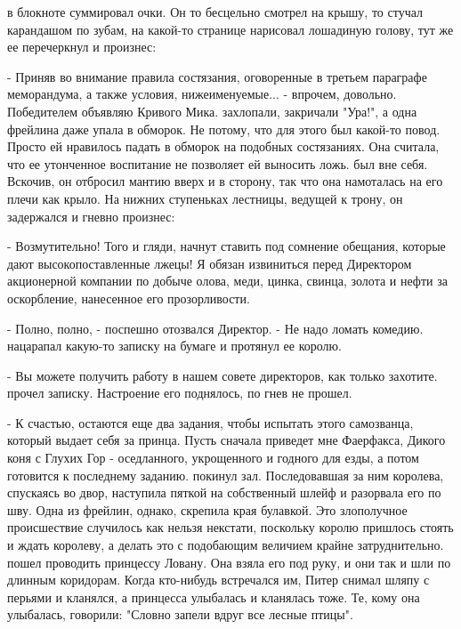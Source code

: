  в блокноте суммировал очки. Он то бесцельно смотрел на 
крышу, то стучал карандашом по зубам, на какой-то странице нарисовал 
лошадиную голову, тут же ее перечеркнул и произнес:
\par- Приняв во внимание правила состязания, оговоренные в третьем 
параграфе меморандума, а также условия, нижеименуемые... - впрочем, 
довольно. Победителем объявляю Кривого Мика.
 захлопали, закричали "Ура!", а одна фрейлина даже упала в 
обморок. Не потому, что для этого был какой-то повод. Просто ей 
нравилось падать в обморок на подобных состязаниях. Она считала, что 
ее утонченное воспитание не позволяет ей выносить ложь.
 был вне себя. Вскочив, он отбросил мантию вверх и в 
сторону, так что она намоталась на его плечи как крыло. На нижних 
ступеньках лестницы, ведущей к трону, он задержался и гневно произнес:
\par- Возмутительно! Того и гляди, начнут ставить под сомнение 
обещания, которые дают высокопоставленные лжецы! Я обязан извиниться 
перед Директором акционерной компании по добыче олова, меди, цинка, 
свинца, золота и нефти за оскорбление, нанесенное его прозорливости.
\par- Полно, полно, - поспешно отозвался Директор. - Не надо ломать 
комедию.
 нацарапал какую-то записку на бумаге и протянул ее королю.
\par- Вы можете получить работу в нашем совете директоров, как только 
захотите.
 прочел записку. Настроение его поднялось, по гнев не 
прошел.
\par- К счастью, остаются еще два задания, чтобы испытать этого 
самозванца, который выдает себя за принца. Пусть сначала приведет мне 
Фаерфакса, Дикого коня с Глухих Гор - оседланного, укрощенного и 
годного для езды, а потом готовится к последнему заданию.
 покинул зал. Последовавшая за ним королева, спускаясь во 
двор, наступила пяткой на собственный шлейф и разорвала его по шву. 
Одна из фрейлин, однако, скрепила края булавкой. Это злополучное 
происшествие случилось как нельзя некстати, поскольку королю пришлось 
стоять и ждать королеву, а делать это с подобающим величием крайне 
затруднительно.
 пошел проводить принцессу Ловану. Она взяла его под руку, и 
они так и шли по длинным коридорам. Когда кто-нибудь встречался им, 
Питер снимал шляпу с перьями и кланялся, а принцесса улыбалась и 
кланялась тоже. Те, кому она улыбалась, говорили: "Словно запели вдруг 
все лесные птицы".
